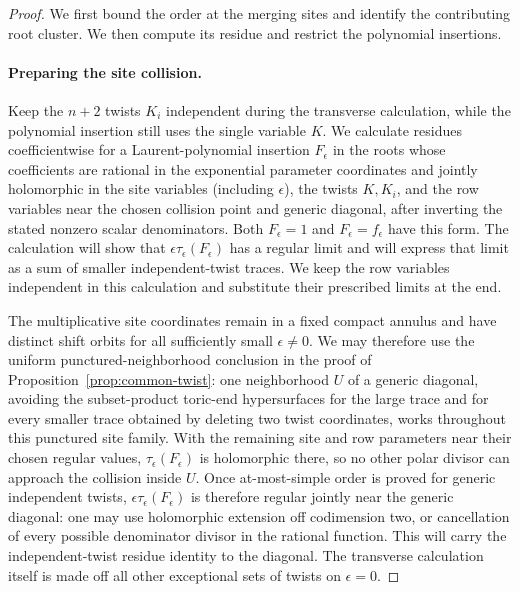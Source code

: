 \begin{proof}
We first bound the order at the merging sites and identify the contributing root cluster. We then compute its residue and restrict the polynomial insertions.

\paragraph{Preparing the site collision.}
Keep the \(n+2\) twists \(K_i\) independent during the transverse calculation, while the polynomial insertion still uses the single variable \(K\). We calculate residues coefficientwise for a Laurent-polynomial insertion \(F_\epsilon\) in the roots whose coefficients are rational in the exponential parameter coordinates and jointly holomorphic in the site variables (including \(\epsilon\)), the twists \(K,K_i\), and the row variables near the chosen collision point and generic diagonal, after inverting the stated nonzero scalar denominators. Both \(F_\epsilon=1\) and \(F_\epsilon=f_\epsilon\) have this form. The calculation will show that \(\epsilon\tau_\epsilon(F_\epsilon)\) has a regular limit and will express that limit as a sum of smaller independent-twist traces. We keep the row variables independent in this calculation and substitute their prescribed limits at the end.

The multiplicative site coordinates remain in a fixed compact annulus and have distinct shift orbits for all sufficiently small \(\epsilon\ne0\). We may therefore use the uniform punctured-neighborhood conclusion in the proof of Proposition~\ref{prop:common-twist}: one neighborhood \(U\) of a generic diagonal, avoiding the subset-product toric-end hypersurfaces for the large trace and for every smaller trace obtained by deleting two twist coordinates, works throughout this punctured site family. With the remaining site and row parameters near their chosen regular values, \(\tau_\epsilon(F_\epsilon)\) is holomorphic there, so no other polar divisor can approach the collision inside \(U\). Once at-most-simple order is proved for generic independent twists, \(\epsilon\tau_\epsilon(F_\epsilon)\) is therefore regular jointly near the generic diagonal: one may use holomorphic extension off codimension two, or cancellation of every possible denominator divisor in the rational function. This will carry the independent-twist residue identity to the diagonal. The transverse calculation itself is made off all other exceptional sets of twists on \(\epsilon=0\).



\end{proof}
